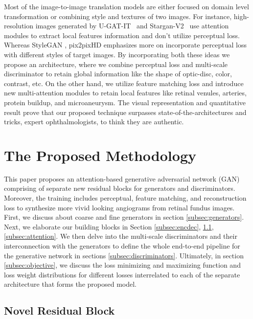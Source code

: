 \documentclass[a4paper,conference]{IEEEtran}
\begin{document}
Most of the image-to-image translation models are either focused on domain level transformation or combining style and textures of two images. For instance, high-resolution images generated by U-GAT-IT~\cite{kim2019u} and Stargan-V2~\cite{choi2020stargan} use attention modules to extract local features information and don't utilize perceptual loss. Whereas StyleGAN \cite{park2019semantic}, pix2pixHD  \cite{wang2018high} emphasizes more on incorporate perceptual loss with different styles of target images. By incorporating both these ideas we propose an architecture, where we combine perceptual loss and multi-scale discriminator to retain global information like the shape of optic-disc, color, contrast, etc. On the other hand, we utilize feature matching loss and introduce new multi-attention modules to retain local features like retinal venules, arteries, protein buildup, and microaneurysm. The visual representation and quantitative result prove that our proposed technique surpasses state-of-the-architectures and tricks, expert ophthalmologists, to think they are authentic.




\section{The Proposed Methodology}
This paper proposes an attention-based generative adversarial network (GAN) comprising of separate new residual blocks for generators and discriminators. Moreover, the training includes perceptual, feature matching, and reconstruction loss to synthesize more vivid looking angiograms from retinal fundus images. First, we discuss about coarse and fine generators in section \ref{subsec:generators}. Next, we elaborate our building blocks in Section \ref{subsec:encdec}, \ref{subsec:residualblock}, \ref{subsec:attention}. We then delve into the multi-scale discriminators and their interconnection with the generators to define the whole end-to-end pipeline for the generative network in sections  \ref{subsec:discriminators}. Ultimately, in section \ref{subsec:objective}, we discuss the loss minimizing and maximizing function and loss weight distributions for different losses interrelated to each of the separate architecture that forms the proposed model.

\iffalse
\subsection{Novel Residual Block}
\label{subsec:residualblock}
\end{document}
